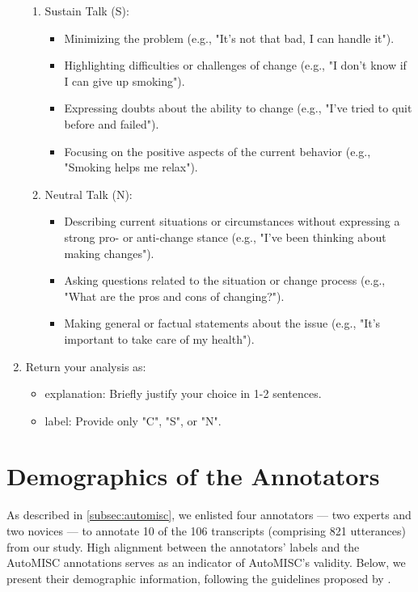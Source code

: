 \begin{tcolorbox}
\begin{enumerate}[itemsep=0pt, parsep=0pt]
\begin{enumerate}[leftmargin=2em]
        \item Sustain Talk (S):
        \begin{itemize}[itemsep=0pt, parsep=0pt]
            \item Minimizing the problem (e.g., "It's not that bad, I can handle it").
            \item Highlighting difficulties or challenges of change (e.g., "I don't know if I can give up smoking").
            \item Expressing doubts about the ability to change (e.g., "I've tried to quit before and failed").
            \item Focusing on the positive aspects of the current behavior (e.g., "Smoking helps me relax").
        \end{itemize}

        \item Neutral Talk (N):
        \begin{itemize}[itemsep=0pt, parsep=0pt]
            \item Describing current situations or circumstances without expressing a strong pro- or anti-change stance (e.g., "I've been thinking about making changes").
            \item Asking questions related to the situation or change process (e.g., "What are the pros and cons of changing?").
            \item Making general or factual statements about the issue (e.g., "It's important to take care of my health").
        \end{itemize}
    \end{enumerate}
    \item Return your analysis as:
    \begin{itemize}
        \item explanation: Briefly justify your choice in 1-2 sentences.
        \item label: Provide only "C", "S", or "N".
    \end{itemize}
\end{enumerate}

\end{tcolorbox}
\vspace{1em}
\section*{Demographics of the Annotators}

As described in \cref{subsec:automisc}, we enlisted four annotators --- two experts and two novices --- to annotate 10 of the 106 transcripts (comprising 821 utterances) from our study. High alignment between the annotators' labels and the AutoMISC annotations serves as an indicator of AutoMISC's validity. Below, we present their demographic information, following the guidelines proposed by \citet{bender-friedman-2018-data}.


